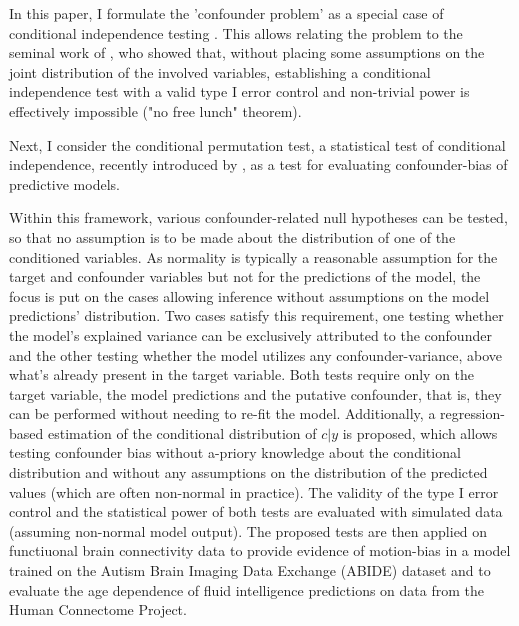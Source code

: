 \documentclass{article}
\theoremstyle{definition}
\begin{document}

In this paper, I formulate the 'confounder problem' as a special case of conditional independence testing \citep{dawid1979conditional}. This allows relating the problem to the seminal work of \cite{shah2020hardness}, who showed that, without placing some assumptions on the joint distribution of the involved variables, establishing a conditional independence test with a valid type I error control and non-trivial power is effectively impossible ("no free lunch" theorem).

Next, I consider the conditional permutation test, a statistical test of conditional independence, recently introduced by \cite{berrett2020conditional}, as a test for evaluating confounder-bias of predictive models.

Within this framework, various confounder-related null hypotheses can be tested, so that no assumption is to be made about the distribution of one of the conditioned variables. As normality is typically a reasonable assumption for the target and confounder variables but not for the predictions of the model, the focus is put on the cases allowing inference without assumptions on the model predictions' distribution.
Two cases satisfy this requirement, one testing whether the model's explained variance can be exclusively attributed to the confounder and the other testing whether the model utilizes any confounder-variance, above what's already present in the target variable.
Both tests require only on the target variable, the model predictions and the putative confounder, that is, they can be performed without needing to re-fit the model.
Additionally, a regression-based estimation of the conditional distribution of $c|y$ is proposed, which allows testing confounder bias without a-priory knowledge about the conditional distribution and without any assumptions on the distribution of the predicted values (which are often non-normal in practice).
The validity of the type I error control and the statistical power of both tests are evaluated with simulated data (assuming non-normal model output).
The proposed tests are then applied on functiuonal brain connectivity data to provide evidence of motion-bias in a model trained on the Autism Brain Imaging Data Exchange (ABIDE) dataset \citep{di2014autism} and to evaluate the age dependence of fluid intelligence predictions on data from the Human Connectome Project.
\end{document}
